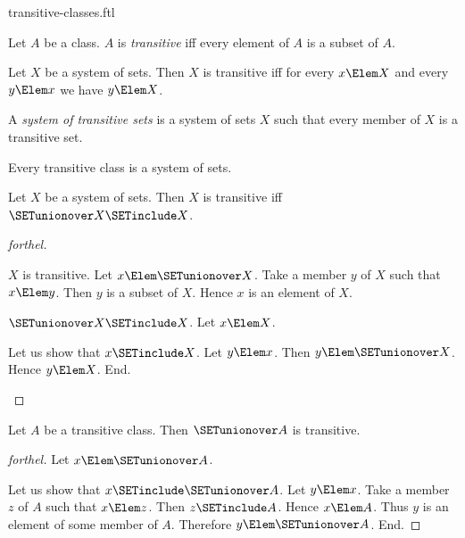 \documentclass{stex}
\begin{document}
\begin{smodule}{transitive-classes.ftl}

\begin{definition}[forthel]
  Let $A$ be a class.
  $A$ is \emph{transitive} iff every element of $A$ is a subset of $A$.
\end{definition}

\begin{proposition}[forthel]
  Let $X$ be a system of sets.
  Then $X$ is transitive iff for every $x \Elem X$ and every $y \Elem x$ we have $y \Elem X$.
\end{proposition}

\begin{definition}[forthel]
  A \emph{system of transitive sets} is a system of sets $X$ such that every member of $X$ is a transitive set.
\end{definition}

\begin{proposition}[forthel]
  Every transitive class is a system of sets.
\end{proposition}

\begin{proposition}[forthel]
  Let $X$ be a system of sets.
  Then $X$ is transitive iff $\SETunionover X \SETinclude X$.
\end{proposition}
\begin{proof}[forthel]
  \begin{case}{$X$ is transitive.}
    Let $x \Elem \SETunionover X$.
    Take a member $y$ of $X$ such that $x \Elem y$.
    Then $y$ is a subset of $X$.
    Hence $x$ is an element of $X$.
  \end{case}

  \begin{case}{$\SETunionover X \SETinclude X$.}
    Let $x \Elem X$.

    Let us show that $x \SETinclude X$.
      Let $y \Elem x$.
      Then $y \Elem \SETunionover X$.
      Hence $y \Elem X$.
    End.
  \end{case}
\end{proof}

\begin{proposition}[forthel]
  Let $A$ be a transitive class.
  Then $\SETunionover A$ is transitive.
\end{proposition}
\begin{proof}[forthel]
  Let $x \Elem \SETunionover A$.

  Let us show that $x \SETinclude \SETunionover A$.
    Let $y \Elem x$.
    Take a member $z$ of $A$ such that $x \Elem z$.
    Then $z \SETinclude A$.
    Hence $x \Elem A$.
    Thus $y$ is an element of some member of $A$.
    Therefore $y \Elem \SETunionover A$.
  End.
\end{proof}


\end{smodule}
\end{document}

